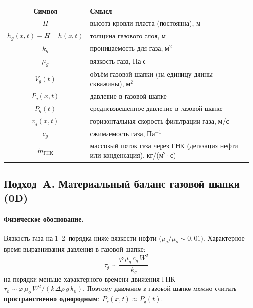 \documentclass[12pt,a4paper]{article}
\begin{document}
\begin{center}
\renewcommand{\arraystretch}{1.25}
\begin{tabular}{cl}
  \hline
  Символ & Смысл \\
  \hline
  $H$                    & высота кровли пласта (постоянна), м \\
  $h_g(x,t) = H - h(x,t)$ & толщина газового слоя, м \\
  $k_g$                  & проницаемость для газа, м$^2$ \\
  $\mu_g$                & вязкость газа, Па$\cdot$с \\
  $V_g(t)$               & объём газовой шапки (на единицу длины
                           скважины), м$^2$ \\
  $P_g(x,t)$             & давление в газовой шапке \\
  $\bar{P}_g(t)$         & средневзвешенное давление в газовой шапке \\
  $v_g(x,t)$             & горизонтальная скорость фильтрации газа, м/с \\
  $c_g$                  & сжимаемость газа, Па$^{-1}$ \\
  $\dot{m}_{\text{ГНК}}$ & массовый поток газа через ГНК (дегазация нефти
                           или конденсация), кг/(м$^2\cdot$с) \\
  \hline
\end{tabular}
\end{center}

\subsection{Подход~A. Материальный баланс газовой шапки (0D)}
\label{sec:gas_cap_0D}

\paragraph{Физическое обоснование.}
Вязкость газа на 1--2~порядка ниже вязкости нефти
($\mu_g/\mu_o \sim 0{,}01$). Характерное время выравнивания давления
в газовой шапке:
\begin{equation}\label{eq:tau_gas}
  \tau_g \sim \frac{\varphi\,\mu_g\,c_g\,W^2}{k_g}
\end{equation}
на порядки меньше характерного времени движения ГНК
$\tau_o \sim \varphi\,\mu_o\,W^2/(k\,\Delta\rho\,g\,h_0)$.
Поэтому давление в газовой шапке можно считать
\textbf{пространственно однородным}: $P_g(x,t) \approx \bar{P}_g(t)$.
\end{document}
